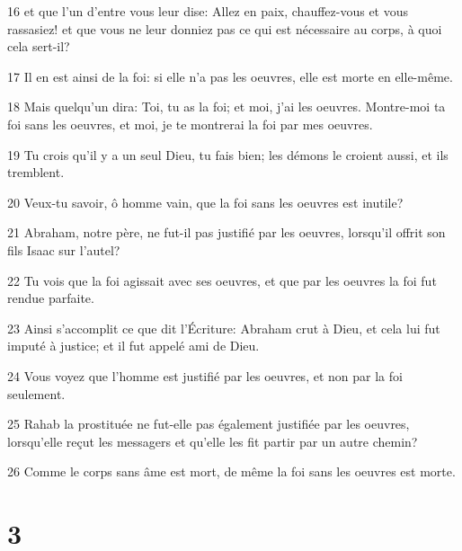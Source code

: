 \par 16 et que l'un d'entre vous leur dise: Allez en paix, chauffez-vous et vous rassasiez! et que vous ne leur donniez pas ce qui est nécessaire au corps, à quoi cela sert-il?
\par 17 Il en est ainsi de la foi: si elle n'a pas les oeuvres, elle est morte en elle-même.
\par 18 Mais quelqu'un dira: Toi, tu as la foi; et moi, j'ai les oeuvres. Montre-moi ta foi sans les oeuvres, et moi, je te montrerai la foi par mes oeuvres.
\par 19 Tu crois qu'il y a un seul Dieu, tu fais bien; les démons le croient aussi, et ils tremblent.
\par 20 Veux-tu savoir, ô homme vain, que la foi sans les oeuvres est inutile?
\par 21 Abraham, notre père, ne fut-il pas justifié par les oeuvres, lorsqu'il offrit son fils Isaac sur l'autel?
\par 22 Tu vois que la foi agissait avec ses oeuvres, et que par les oeuvres la foi fut rendue parfaite.
\par 23 Ainsi s'accomplit ce que dit l'Écriture: Abraham crut à Dieu, et cela lui fut imputé à justice; et il fut appelé ami de Dieu.
\par 24 Vous voyez que l'homme est justifié par les oeuvres, et non par la foi seulement.
\par 25 Rahab la prostituée ne fut-elle pas également justifiée par les oeuvres, lorsqu'elle reçut les messagers et qu'elle les fit partir par un autre chemin?
\par 26 Comme le corps sans âme est mort, de même la foi sans les oeuvres est morte.

\chapter{3}

